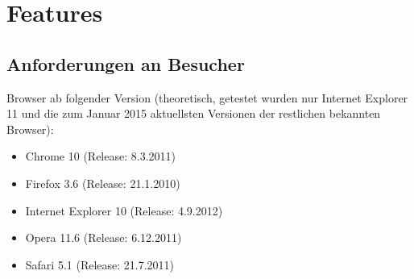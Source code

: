 \chapter{Features}

\section{Anforderungen an Besucher}
Browser ab folgender Version (theoretisch, getestet wurden nur Internet Explorer 11 und die zum Januar 2015 aktuellsten Versionen der restlichen bekannten Browser):
\begin{itemize}
	\item Chrome 10 (Release: 8.3.2011)
	\item Firefox 3.6 (Release: 21.1.2010)
	\item Internet Explorer 10 (Release: 4.9.2012)
	\item Opera 11.6 (Release: 6.12.2011)
	\item Safari 5.1 (Release: 21.7.2011)
\end{itemize}
